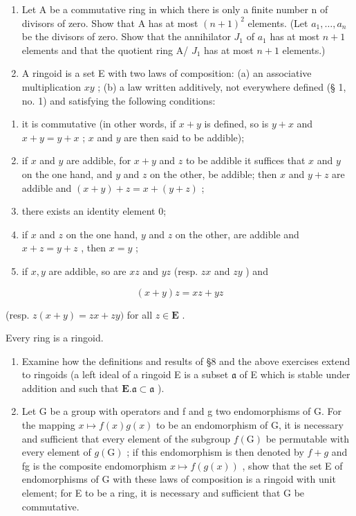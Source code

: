 \begin{enumerate}
\def\labelenumi{\arabic{enumi}.}
\setcounter{enumi}{13}
\item
  Let A be a commutative ring in which there is only a finite number n of divisors of zero. Show that A has at most \((n+1)^{2}\) elements. (Let \(a_{1},\ldots,a_{n}\) be the divisors of zero. Show that the annihilator \(J_{1}\) of \(a_{1}\) has at most \(n+1\) elements and that the quotient ring A/ \(J_{1}\) has at most \(n+1\) elements.)
\item
  A ringoid is a set E with two laws of composition: (a) an associative multiplication \(xy\) ; (b) a law written additively, not everywhere defined (§ 1, no. 1) and satisfying the following conditions:
\end{enumerate}

\begin{enumerate}
\def\labelenumi{(\arabic{enumi})}
\item
  it is commutative (in other words, if \(x + y\) is defined, so is \(y + x\) and \(x + y = y + x\) ; \(x\) and \(y\) are then said to be addible);
\item
  if \(x\) and \(y\) are addible, for \(x + y\) and \(z\) to be addible it suffices that \(x\) and \(y\) on the one hand, and \(y\) and \(z\) on the other, be addible; then \(x\) and \(y + z\) are addible and \((x + y) + z = x + (y + z)\) ;
\item
  there exists an identity element 0;
\item
  if \(x\) and \(z\) on the one hand, \(y\) and \(z\) on the other, are addible and \(x + z = y + z\) , then \(x = y\) ;
\item
  if \(x, y\) are addible, so are \(xz\) and \(yz\) (resp. \(zx\) and \(zy\) ) and
\end{enumerate}

\[
(x + y) z = x z + y z
\]

(resp. \(z(x + y) = zx + zy)\) for all \(z \in \mathbf{E}\) .

Every ring is a ringoid.

\begin{enumerate}
\def\labelenumi{(\alph{enumi})}
\item
  Examine how the definitions and results of §8 and the above exercises extend to ringoids (a left ideal of a ringoid E is a subset \(\mathfrak{a}\) of E which is stable under addition and such that \(\mathbf{E}.\mathfrak{a}\subset \mathfrak{a}\) ).
\item
  Let G be a group with operators and f and g two endomorphisms of G. For the mapping \(x \mapsto f(x)g(x)\) to be an endomorphism of G, it is necessary and sufficient that every element of the subgroup \(f(\mathrm{G})\) be permutable with every element of \(g(\mathrm{G})\) ; if this endomorphism is then denoted by \(f + g\) and fg is the composite endomorphism \(x \mapsto f(g(x))\) , show that the set E of endomorphisms of G with these laws of composition is a ringoid with unit element; for E to be a ring, it is necessary and sufficient that G be commutative.
\end{enumerate}

